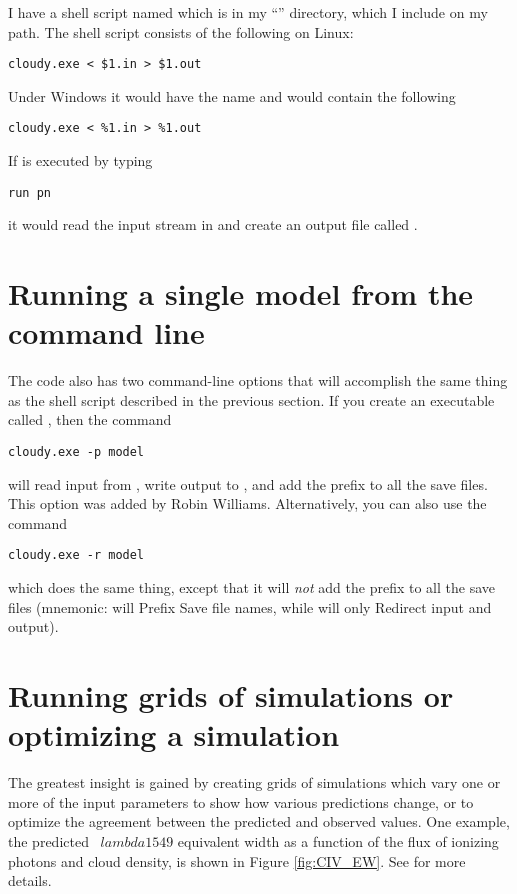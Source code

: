 I have a shell script named  which is in my
``'' directory, which
I include on my path.
The shell script  consists of the following on
Linux:
\begin{verbatim}
cloudy.exe < $1.in > $1.out
\end{verbatim}
Under Windows it would have the name  and would contain the following
\begin{verbatim}
cloudy.exe < %1.in > %1.out
\end{verbatim}
If  is executed by typing
\begin{verbatim}
run pn
\end{verbatim}
it would read the input stream in  and create
an output file called .

\section{Running a single model from the command line}

The code also has two command-line options that will accomplish the same thing
as the shell script described in the previous section. If you create an
executable called , then the command
\begin{verbatim}
cloudy.exe -p model
\end{verbatim}
will read input from , write output to
, and add the prefix  to all the save
files. This option was added by Robin Williams. Alternatively, you can also
use the command
\begin{verbatim}
cloudy.exe -r model
\end{verbatim}
which does the same thing, except that it will {\em not} add the prefix
 to all the save files (mnemonic:  will
Prefix Save file names, while  will only Redirect input
and output).

\section{Running grids of simulations or optimizing a simulation}

The greatest insight is gained by creating grids of simulations
which vary one or more of the input parameters to show how
various predictions change, or to optimize the agreement between the
predicted and observed values.
One example, the predicted \civ\ $lambda 1549$ equivalent width as a
function of the flux of ionizing photons and cloud density,
is shown in Figure \ref{fig:CIV_EW}.
See \citet{BaldwinEtAl95} for more details.

